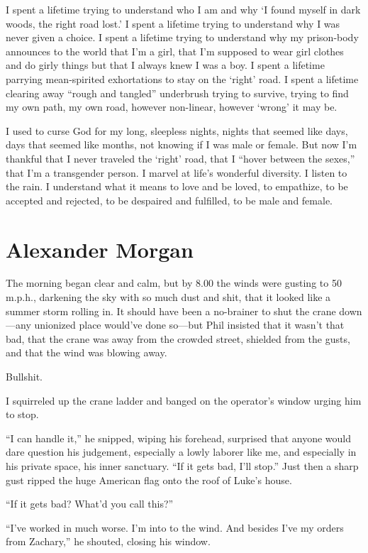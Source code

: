 I spent a lifetime trying to understand who I am and why `I found myself
in dark woods, the right road lost.' I spent a lifetime trying to
understand why I was never given a choice. I spent a lifetime trying to
understand why my prison-body announces to the world that I'm a girl,
that I'm supposed to wear girl clothes and do girly things but that I
always knew I was a boy. I spent a lifetime parrying mean-spirited
exhortations to stay on the `right' road. I spent a lifetime clearing
away ``rough and tangled'' underbrush trying to survive, trying to find
my own path, my own road, however non-linear, however `wrong' it may be.

I used to curse God for my long, sleepless nights, nights that seemed
like days, days that seemed like months, not knowing if I was male or
female. But now I'm thankful that I never traveled the `right' road,
that I ``hover between the sexes,'' that I'm a transgender person. I
marvel at life's wonderful diversity. I listen to the rain. I understand
what it means to love and be loved, to empathize, to be accepted and
rejected, to be despaired and fulfilled, to be male and female.

\chapter{Alexander Morgan}

\titlemark

The morning began clear and calm, but by 8.00 the winds were gusting to
50 m.p.h., darkening the sky with so much dust and shit, that it looked
like a summer storm rolling in. It should have been a no-brainer to shut
the crane down---any unionized place would've done so---but Phil
insisted that it wasn't that bad, that the crane was away from the
crowded street, shielded from the gusts, and that the wind was blowing
away.

Bullshit.

I squirreled up the crane ladder and banged on the operator's window
urging him to stop.

``I can handle it,'' he snipped, wiping his forehead, surprised that
anyone would dare question his judgement, especially a lowly laborer
like me, and especially in his private space, his inner sanctuary. ``If
it gets bad, I'll stop.'' Just then a sharp gust ripped the huge
American flag onto the roof of Luke's house.

``If it gets bad? What'd you call this?''

``I've worked in much worse. I'm into to the wind. And besides I've my
orders from Zachary,'' he shouted, closing his window.


